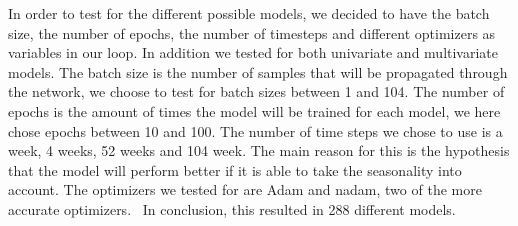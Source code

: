 In order to test for the different possible models, we decided to have the batch size, the number of epochs, the number of timesteps and different optimizers as variables in our loop. In addition we tested for both univariate and multivariate models. The batch size is the number of samples that will be propagated through the network, we choose to test for batch sizes between 1 and 104. The number of epochs is the amount of times the model will be trained for each model, we here chose epochs between 10 and 100. The number of time steps we chose to use is a week, 4 weeks, 52 weeks and 104 week. The main reason for this is the hypothesis that the model will perform better if it is able to take the seasonality into account. The optimizers we tested for are Adam and nadam, two of the more accurate optimizers.~\parencite{zaman2021} In conclusion, this resulted in 288 different models.